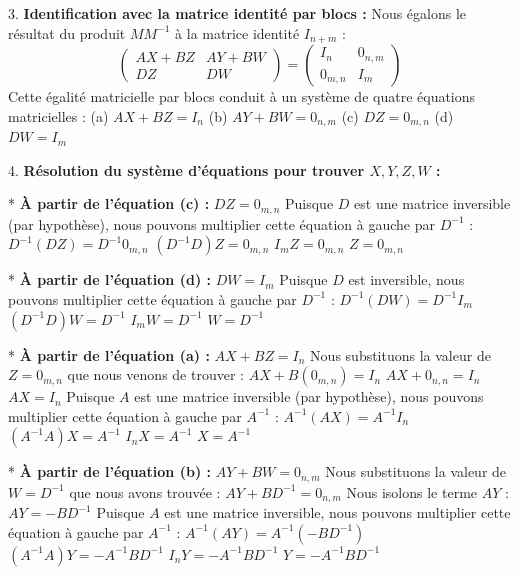 \documentclass{report}
\begin{document}
3.  \textbf{Identification avec la matrice identité par blocs :}
    Nous égalons le résultat du produit $M M^{-1}$ à la matrice identité $I_{n+m}$ :
    $$\begin{pmatrix} A X + B Z & A Y + B W \\ D Z & D W \end{pmatrix} = \begin{pmatrix} I_n & 0_{n,m} \\ 0_{m,n} & I_m \end{pmatrix}$$
    Cette égalité matricielle par blocs conduit à un système de quatre équations matricielles :
    (a) $A X + B Z = I_n$
    (b) $A Y + B W = 0_{n,m}$
    (c) $D Z = 0_{m,n}$
    (d) $D W = I_m$

4.  \textbf{Résolution du système d'équations pour trouver $X, Y, Z, W$ :}

    *   \textbf{À partir de l'équation (c) :} $D Z = 0_{m,n}$
        Puisque $D$ est une matrice inversible (par hypothèse), nous pouvons multiplier cette équation à gauche par $D^{-1}$ :
        $D^{-1} (D Z) = D^{-1} 0_{m,n}$
        $(D^{-1} D) Z = 0_{m,n}$
        $I_m Z = 0_{m,n}$
        $Z = 0_{m,n}$

    *   \textbf{À partir de l'équation (d) :} $D W = I_m$
        Puisque $D$ est inversible, nous pouvons multiplier cette équation à gauche par $D^{-1}$ :
        $D^{-1} (D W) = D^{-1} I_m$
        $(D^{-1} D) W = D^{-1}$
        $I_m W = D^{-1}$
        $W = D^{-1}$

    *   \textbf{À partir de l'équation (a) :} $A X + B Z = I_n$
        Nous substituons la valeur de $Z = 0_{m,n}$ que nous venons de trouver :
        $A X + B (0_{m,n}) = I_n$
        $A X + 0_{n,n} = I_n$
        $A X = I_n$
        Puisque $A$ est une matrice inversible (par hypothèse), nous pouvons multiplier cette équation à gauche par $A^{-1}$ :
        $A^{-1} (A X) = A^{-1} I_n$
        $(A^{-1} A) X = A^{-1}$
        $I_n X = A^{-1}$
        $X = A^{-1}$

    *   \textbf{À partir de l'équation (b) :} $A Y + B W = 0_{n,m}$
        Nous substituons la valeur de $W = D^{-1}$ que nous avons trouvée :
        $A Y + B D^{-1} = 0_{n,m}$
        Nous isolons le terme $A Y$ :
        $A Y = -B D^{-1}$
        Puisque $A$ est une matrice inversible, nous pouvons multiplier cette équation à gauche par $A^{-1}$ :
        $A^{-1} (A Y) = A^{-1} (-B D^{-1})$
        $(A^{-1} A) Y = -A^{-1} B D^{-1}$
        $I_n Y = -A^{-1} B D^{-1}$
        $Y = -A^{-1} B D^{-1}$
\end{document}

